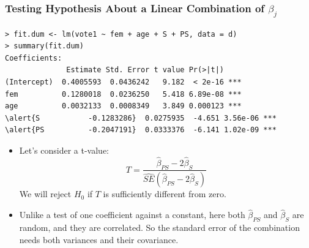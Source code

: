 \documentclass[xcolor=svgnames,9pt,english,aspectratio=169,t]{beamer}
\begin{document}
\begin{frame}[fragile]
\frametitle{Testing Hypothesis About a Linear Combination of $\beta_j$}
\footnotesize
{}
\begin{Verbatim}[fontsize=\footnotesize, frame=single, label=R Code, commandchars=\\\{\}]
> fit.dum <- lm(vote1 ~ fem + age + S + PS, data = d)
> summary(fit.dum)
Coefficients:
              Estimate Std. Error t value Pr(>|t|)
(Intercept)  0.4005593  0.0436242   9.182  < 2e-16 ***
fem          0.1280018  0.0236250   5.418 6.89e-08 ***
age          0.0032133  0.0008349   3.849 0.000123 ***
\alert{S           -0.1283286}  0.0275935  -4.651 3.56e-06 ***
\alert{PS          -0.2047191}  0.0333376  -6.141 1.02e-09 ***
\end{Verbatim}
\footnotesize
\begin{itemize}
\addtolength{\itemsep}{.5\baselineskip}
\item Let's consider a t-value:
\[T = \frac{\widehat{\beta}_{PS}-2\widehat{\beta}_{S}}{\widehat{SE}(\widehat{\beta}_{PS}-2\widehat{\beta}_{S})}\]
We will reject $H_0$ if $T$ is sufficiently different from zero.
\pause
\item Unlike a test of one coefficient against a constant, here both $\hat\beta_{PS}$ and $\hat\beta_{S}$ are random, and they are correlated. So the standard error of the combination needs both variances and their covariance.
\end{itemize}
\end{frame}


\end{document}
